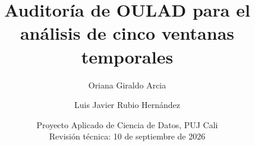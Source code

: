 \documentclass[11pt,a4paper]{article}
\title{\color{azul}Auditoría de OULAD para el análisis de cinco ventanas temporales}
\author{Oriana Giraldo Arcia \and Luis Javier Rubio Hernández}
\date{Proyecto Aplicado de Ciencia de Datos, PUJ Cali\\Revisión técnica: 10 de septiembre de 2026}
\renewcommand{\tablename}{Tabla}
\begin{document}
\renewcommand{\tablename}{Tabla}
\maketitle

\par\vspace{6pt}


\end{document}
